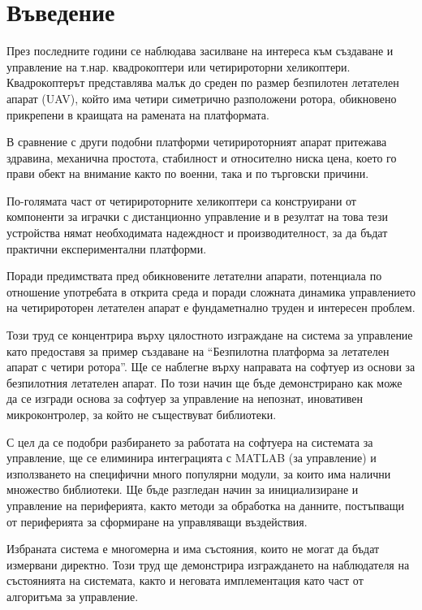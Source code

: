 \section{Въведение}  

През последните години се наблюдава засилване на интереса към създаване и управление на т.нар. квадрокоптери или четирироторни хеликоптери.
Квадрокоптерът представлява малък до среден по размер безпилотен летателен апарат (UAV), който има четири симетрично разположени ротора, обикновено прикрепени в краищата на рамената на платформата. 

В сравнение с други подобни платформи четирироторният апарат притежава здравина, механична простота, стабилност и относително ниска цена, което го прави обект на внимание както по военни, така и по търговски причини.

По-голямата част от четирироторните хеликоптери са конструирани от компоненти за играчки с дистанционно управление и в резултат на това тези устройства нямат необходимата надеждност и производителност, за да бъдат практични експериментални платформи. 

Поради предимствата пред обикновените летателни апарати, потенциала по отношение употребата в открита среда и поради сложната динамика управлението на четирироторен летателен апарат е фундаметнално труден и интересен проблем.



Този труд се концентрира върху цялостното изграждане на система за управление като предоставя
за пример създаване на \enquote{Безпилотна платформа за летателен апарат с четири ротора}.
Ще се наблегне върху направата на софтуер из основи за безпилотния летателен апарат.
По този начин ще бъде демонстрирано как може да се изгради основа за софтуер за управление на непознат, иновативен микроконтролер, за който не съществуват библиотеки. 

С цел да се подобри разбирането за работата на софтуера на системата за управление, ще се елиминира интеграцията с MATLAB (за управление) и използването на специфични много популярни модули, за които има налични множество библиотеки.
Ще бъде разгледан начин за инициализиране и управление на периферията, както методи за обработка на данните, постъпващи от периферията за сформиране на управляващи въздействия.

Избраната система е многомерна и има състояния, които не могат да бъдат измервани директно.
Този труд ще демонстрира изграждането на наблюдателя на състоянията на системата, както и неговата имплементация като част от алгоритъма за управление. 


